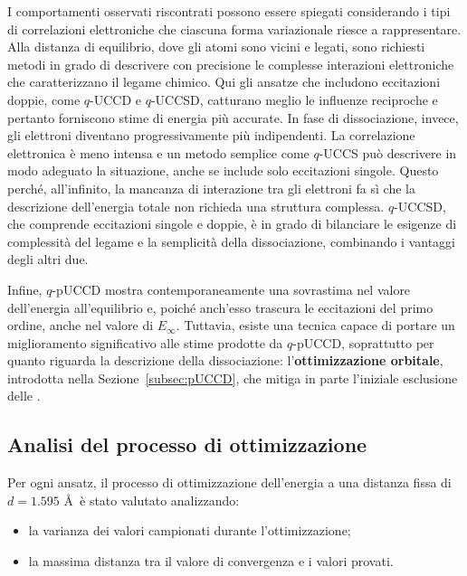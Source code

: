 I comportamenti osservati riscontrati possono essere spiegati considerando i tipi di correlazioni elettroniche che ciascuna forma variazionale riesce a rappresentare. Alla distanza di equilibrio, dove gli atomi sono vicini e legati, sono richiesti metodi in grado di descrivere con precisione le complesse interazioni elettroniche che caratterizzano il legame chimico. Qui gli ansatze che includono eccitazioni doppie, come $q$-UCCD e $q$-UCCSD, catturano meglio le influenze reciproche e pertanto forniscono stime di energia più accurate.
In fase di dissociazione, invece, gli elettroni diventano progressivamente più indipendenti. La correlazione elettronica è meno intensa e un metodo semplice come $q$-UCCS può descrivere in modo adeguato la situazione, anche se include solo eccitazioni singole. Questo perché, all’infinito, la mancanza di interazione tra gli elettroni fa sì che la descrizione dell’energia totale non richieda una struttura complessa.
$q$-UCCSD, che comprende eccitazioni singole e doppie, è in grado di bilanciare le esigenze di complessità del legame e la semplicità della dissociazione, combinando i vantaggi degli altri due.

Infine, $q$-pUCCD mostra contemporaneamente una sovrastima nel valore dell'energia all'equilibrio e, poiché anch'esso trascura le eccitazioni del primo ordine, anche nel valore di $E_\infty$. Tuttavia, esiste una tecnica capace di portare un miglioramento significativo alle stime prodotte da $q$-pUCCD, soprattutto per quanto riguarda la descrizione della dissociazione: l'\textbf{ottimizzazione orbitale}, introdotta nella Sezione~\ref{subsec:pUCCD}, che mitiga in parte l'iniziale esclusione delle .

\subsection{Analisi del processo di ottimizzazione}

Per ogni ansatz, il processo di ottimizzazione dell’energia a una distanza fissa di $d=1.595$ \AA~è stato valutato analizzando:
\begin{itemize}
    \item la varianza dei valori campionati durante l’ottimizzazione;
    \item la massima distanza tra il valore di convergenza e i valori provati.
\end{itemize}

